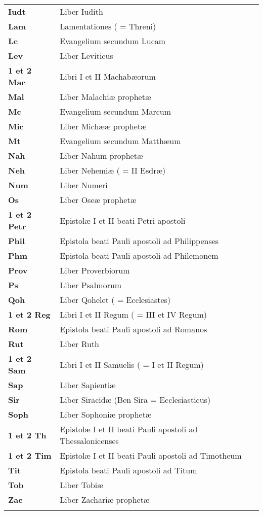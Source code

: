 \begin{longtable}{>{\small\bf}p{1.5cm}<{} >{\small}p{7cm}<{}}
Iudt & Liber Iudith\\
Lam & Lamentationes ( = Threni)\\
Lc & Evangelium secundum Lucam\\
Lev & Liber Leviticus\\
1 et 2 Mac & Libri I et II Machabæorum\\
Mal & Liber Malachiæ prophetæ\\
Mc & Evangelium secundum Marcum\\
Mic & Liber Michææ prophetæ\\
Mt & Evangelium secundum Matthæum\\
Nah & Liber Nahum prophetæ\\
Neh & Liber Nehemiæ ( = II Esdræ)\\
Num & Liber Numeri\\
Os & Liber Oseæ prophetæ\\
1 et 2 Petr & Epistolæ I et II beati Petri apostoli\\
Phil & Epistola beati Pauli apostoli ad Philippenses\\
Phm & Epistola beati Pauli apostoli ad Philemonem\\
Prov & Liber Proverbiorum\\
Ps & Liber Psalmorum\\
Qoh & Liber Qohelet ( = Ecclesiastes)\\
1 et 2 Reg & Libri I et II Regum ( = III et IV Regum)\\
Rom & Epistola beati Pauli apostoli ad Romanos\\
Rut & Liber Ruth\\
1 et 2 Sam & Libri I et II Samuelis ( = I et II Regum)\\
Sap & Liber Sapientiæ\\
Sir & Liber Siracidæ (Ben Sira = Ecclesiasticus)\\
Soph & Liber Sophoniæ prophetæ\\
1 et 2 Th & Epistolæ I et II beati Pauli apostoli ad Thessalonicenses\\
1 et 2 Tim & Epistolæ I et II beati Pauli apostoli ad Timotheum\\
Tit & Epistola beati Pauli apostoli ad Titum\\
Tob & Liber Tobiæ\\
Zac & Liber Zachariæ prophetæ\\
\thispagestyle{empty}
\end{longtable}

